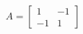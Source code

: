 \documentclass[preview]{standalone}
\begin{document}
\begin{center}
$\displaystyle A=\left[\begin{matrix}1 & -1\\-1 & 1\end{matrix}\right]$
\end{center}
\end{document}
